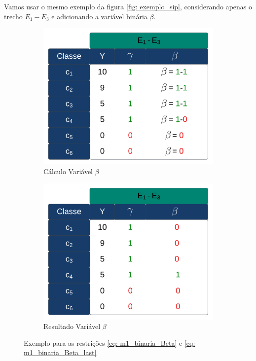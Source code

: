 Vamos usar o mesmo exemplo da figura \ref{fig: exemplo_sip}, considerando apenas o trecho $E_1-E_3$ e adicionando a variável binária $\beta$.

\begin{figure}[h!]
	\centering
	\begin{subfigure}[b]{0.35\linewidth}
		\includegraphics[width=\linewidth]{img/BL_1.png}
		\caption{Cálculo Variável $\beta$}
		\label{fig:Beta_1}
	\end{subfigure}\hspace{5mm}
	\begin{subfigure}[b]{0.35\linewidth}
		\includegraphics[width=\linewidth]{img/BL_2.png}
		\caption{Resultado Variável $\beta$}
		\label{fig:Beta_2}
	\end{subfigure}
	\caption{Exemplo para as restrições \ref{eq: m1_binaria_Beta} e \ref{eq: m1_binaria_Beta_last}}
	\label{fig:Beta}
\end{figure}

